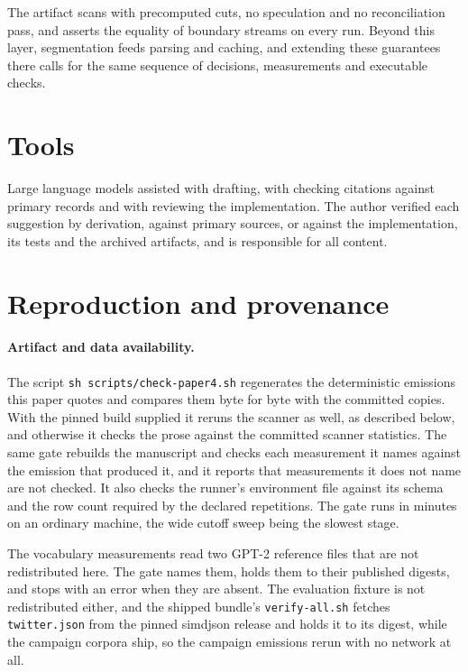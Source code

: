 \documentclass[11pt,a4paper]{article}
\theoremstyle{definition}
\theoremstyle{plain}
\newcommand{\code}[1]{\texttt{#1}}
\begin{document}
The artifact scans with precomputed cuts, no speculation and no reconciliation pass, and asserts the equality of
boundary streams on every run. Beyond this layer, segmentation feeds parsing and caching, and extending these guarantees
there calls for the same sequence of decisions, measurements and executable checks.

\section*{Tools}

Large language models assisted with drafting, with checking citations against primary records and with reviewing the
implementation. The author verified each suggestion by derivation, against primary sources, or against the
implementation, its tests and the archived artifacts, and is responsible for all content.

\appendix
\section{Reproduction and provenance}\label{app:provenance}

\paragraph{Artifact and data availability.} The script \code{sh scripts/check-paper4.sh} regenerates the deterministic
emissions this paper quotes and compares them byte for byte with the committed copies. With the pinned build supplied it
reruns the scanner as well, as described below, and otherwise it checks the prose against the committed scanner
statistics. The same gate rebuilds the manuscript and checks each measurement it names against the emission that
produced it, and it reports that measurements it does not name are not checked. It also checks the runner's environment
file against its schema and the row count required by the declared repetitions. The gate runs in minutes on an ordinary
machine, the wide cutoff sweep being the slowest stage.

The vocabulary measurements read two GPT-2 reference files that are not redistributed here. The gate names them, holds
them to their published digests, and stops with an error when they are absent. The evaluation fixture is not
redistributed either, and the shipped bundle's \code{verify-all.sh} fetches \code{twitter.json} from the pinned simdjson
release and holds it to its digest, while the campaign corpora ship, so the campaign emissions rerun with no network at
all.
\end{document}
